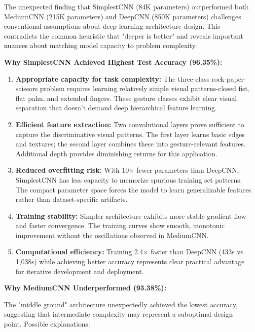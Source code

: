 \documentclass[12pt,a4paper]{article}
\begin{document}
The unexpected finding that SimplestCNN (84K parameters) outperformed both MediumCNN (215K parameters) and DeepCNN (850K parameters) challenges conventional assumptions about deep learning architecture design. This contradicts the common heuristic that "deeper is better" and reveals important nuances about matching model capacity to problem complexity.

\textbf{Why SimplestCNN Achieved Highest Test Accuracy (96.35\%):}

\begin{enumerate}
    \item \textbf{Appropriate capacity for task complexity:} The three-class rock-paper-scissors problem requires learning relatively simple visual patterns-closed fist, flat palm, and extended fingers. These gesture classes exhibit clear visual separation that doesn't demand deep hierarchical feature learning.
    
    \item \textbf{Efficient feature extraction:} Two convolutional layers prove sufficient to capture the discriminative visual patterns. The first layer learns basic edges and textures; the second layer combines these into gesture-relevant features. Additional depth provides diminishing returns for this application.
    
    \item \textbf{Reduced overfitting risk:} With 10× fewer parameters than DeepCNN, SimplestCNN has less capacity to memorize spurious training set patterns. The compact parameter space forces the model to learn generalizable features rather than dataset-specific artifacts.
    
    \item \textbf{Training stability:} Simpler architecture exhibits more stable gradient flow and faster convergence. The training curves show smooth, monotonic improvement without the oscillations observed in MediumCNN.
    
    \item \textbf{Computational efficiency:} Training 2.4× faster than DeepCNN (433s vs 1,038s) while achieving better accuracy represents clear practical advantage for iterative development and deployment.
\end{enumerate}

\textbf{Why MediumCNN Underperformed (93.38\%):}

The "middle ground" architecture unexpectedly achieved the lowest accuracy, suggesting that intermediate complexity may represent a suboptimal design point. Possible explanations:
\end{document}
